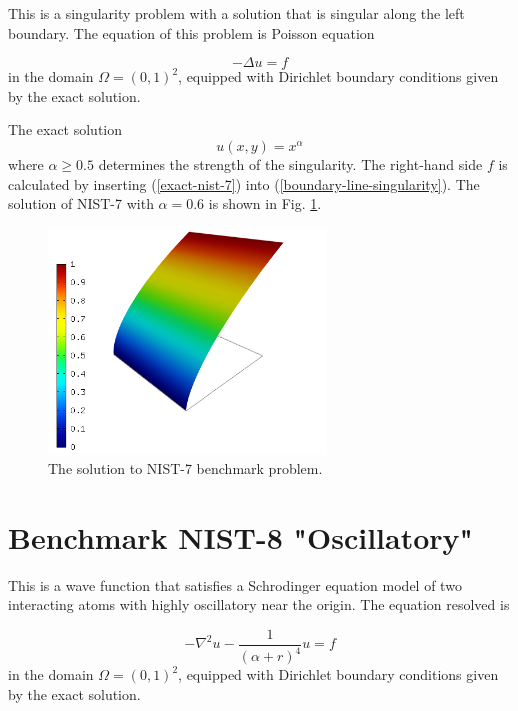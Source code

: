 \documentclass[12pt]{elsarticle}
\begin{document}
This is a singularity problem with a solution that is singular along the left boundary.
The equation of this problem is Poisson equation

\begin{equation} \label{boundary-line-singularity}
-\Delta u = f
\end{equation}
in the domain $\Omega = (0, 1)^2$, equipped with Dirichlet boundary conditions
given by the exact solution.

The exact solution
\begin{equation}\label{exact-nist-7}
u(x,y) = x^{\alpha}
\end{equation}
where $\alpha \geq 0.5$ determines the strength of the singularity.
The right-hand side $f$ is calculated by inserting (\ref{exact-nist-7}) into (\ref{boundary-line-singularity}).
The solution of NIST-7 with $\alpha = 0.6$ is shown in Fig. \ref{fig:sln-nist07}.

\begin{figure}[!ht]
\centering
\includegraphics[height=6cm]{nist/nist-7/solution.png}
\caption{The solution to NIST-7 benchmark problem.}
\label{fig:sln-nist07}
\end{figure}

\section{Benchmark NIST-8 "Oscillatory"}
\label{sec:bench-8}

This is a wave function that satisfies a Schrodinger equation model of two
interacting atoms with highly oscillatory near the origin.
The equation resolved is

\begin{equation} \label{oscillatory}
-\nabla^{2} u - \frac{1}{(\alpha + r)^{4}} u = f
\end{equation}
in the domain $\Omega = (0, 1)^2$, equipped with Dirichlet boundary conditions
given by the exact solution.
\end{document}
